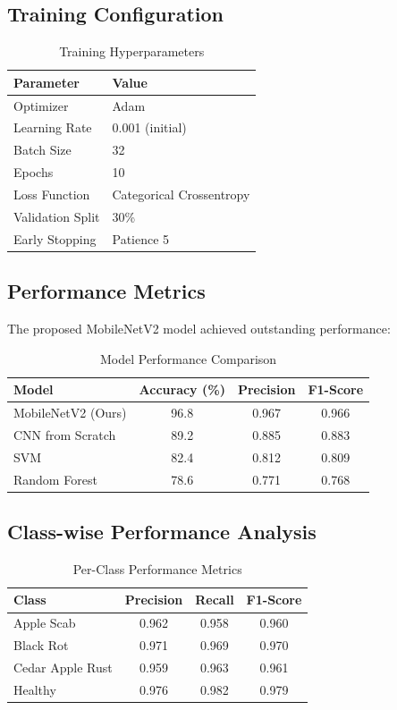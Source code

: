 \documentclass[conference,10pt,letterpaper]{IEEEtran}
\begin{document}
\subsection{Training Configuration}

\begin{table}[htbp]
\centering
\caption{Training Hyperparameters}
\label{tab:hyperparameters}
\begin{tabular}{ll}
\toprule
Parameter & Value \\
\midrule
Optimizer & Adam \\
Learning Rate & 0.001 (initial) \\
Batch Size & 32 \\
Epochs & 10 \\
Loss Function & Categorical Crossentropy \\
Validation Split & 30\% \\
Early Stopping & Patience 5 \\
\bottomrule
\end{tabular}
\end{table}

\subsection{Performance Metrics}

The proposed MobileNetV2 model achieved outstanding performance:
\begin{table}[htbp]
\centering
\caption{Model Performance Comparison}
\label{tab:performance}
\begin{tabular}{lccc}
\toprule
Model & Accuracy (\%) & Precision & F1-Score \\
\midrule
MobileNetV2 (Ours) & 96.8 & 0.967 & 0.966 \\
CNN from Scratch & 89.2 & 0.885 & 0.883 \\
SVM & 82.4 & 0.812 & 0.809 \\
Random Forest & 78.6 & 0.771 & 0.768 \\
\bottomrule
\end{tabular}
\end{table}

\subsection{Class-wise Performance Analysis}

\begin{table}[htbp]
\centering
\caption{Per-Class Performance Metrics}
\label{tab:class_performance}
\begin{tabular}{lccc}
\toprule
Class & Precision & Recall & F1-Score \\
\midrule
Apple Scab & 0.962 & 0.958 & 0.960 \\
Black Rot & 0.971 & 0.969 & 0.970 \\
Cedar Apple Rust & 0.959 & 0.963 & 0.961 \\
Healthy & 0.976 & 0.982 & 0.979 \\
\bottomrule
\end{tabular}
\end{table}
\end{document}
